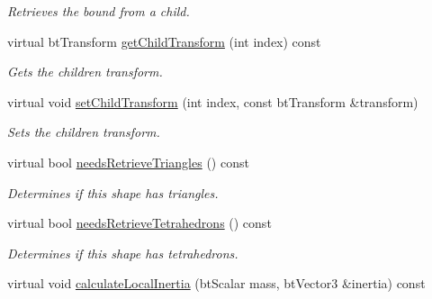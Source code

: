\begin{CompactItemize}
\begin{CompactList}\small\item\em Retrieves the bound from a child. \item\end{CompactList}\item 
\hypertarget{classbt_g_impact_compound_shape_9fa7a1a4793231951d76ad9cb7e13f40}{
virtual btTransform \hyperlink{classbt_g_impact_compound_shape_9fa7a1a4793231951d76ad9cb7e13f40}{getChildTransform} (int index) const }
\label{classbt_g_impact_compound_shape_9fa7a1a4793231951d76ad9cb7e13f40}

\begin{CompactList}\small\item\em Gets the children transform. \item\end{CompactList}\item 
virtual void \hyperlink{classbt_g_impact_compound_shape_560410e20842ad73227d7712a574385c}{setChildTransform} (int index, const btTransform \&transform)
\begin{CompactList}\small\item\em Sets the children transform. \item\end{CompactList}\item 
\hypertarget{classbt_g_impact_compound_shape_41a26228c6b7e9125a9fe1d7725b3e83}{
virtual bool \hyperlink{classbt_g_impact_compound_shape_41a26228c6b7e9125a9fe1d7725b3e83}{needsRetrieveTriangles} () const }
\label{classbt_g_impact_compound_shape_41a26228c6b7e9125a9fe1d7725b3e83}

\begin{CompactList}\small\item\em Determines if this shape has triangles. \item\end{CompactList}\item 
\hypertarget{classbt_g_impact_compound_shape_cc105ecae2f0c117f861aa939c978748}{
virtual bool \hyperlink{classbt_g_impact_compound_shape_cc105ecae2f0c117f861aa939c978748}{needsRetrieveTetrahedrons} () const }
\label{classbt_g_impact_compound_shape_cc105ecae2f0c117f861aa939c978748}

\begin{CompactList}\small\item\em Determines if this shape has tetrahedrons. \item\end{CompactList}\item 
\hypertarget{classbt_g_impact_compound_shape_64f0a70cf342e6bbbcc9721f2a121450}{
virtual void \hyperlink{classbt_g_impact_compound_shape_64f0a70cf342e6bbbcc9721f2a121450}{calculateLocalInertia} (btScalar mass, btVector3 \&inertia) const }
\label{classbt_g_impact_compound_shape_64f0a70cf342e6bbbcc9721f2a121450}


\end{CompactItemize}
